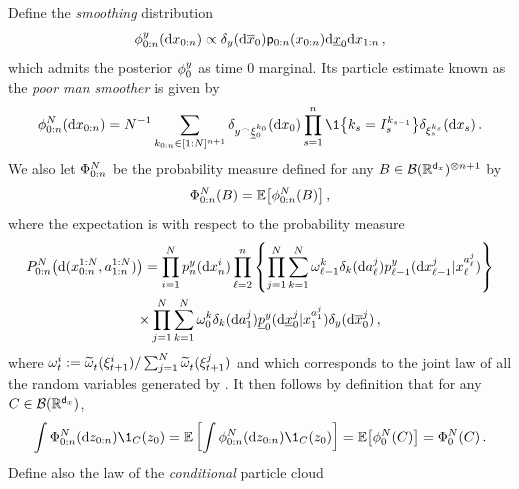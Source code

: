 Define the \emph{smoothing} distribution 
\begin{equation} 
    \filter{0:n}{y}{\rmd \lstate_{0:n}} \propto \delta_{\lmeas}(\rmd \ltopstate_0) \bwmarg{0:n}{\lstate_{0:n}}  \rmd \lbottomstate_0 \rmd \lstate_{1:n} \eqsp,
\end{equation}
which admits the posterior $\filter{0}{\lmeas}{}$ as time $0$ marginal. Its particle estimate known as the \emph{poor man smoother} is given by 
\begin{equation} 
    \filter{0:n}{N}{\rmd x_{0:n}} = N^{-1} \sum_{k_{0:n} \in [1:N]^{n+1}}  \delta_{\cat{\lmeas}{\bparticle^{k_0}_{0}}}(\rmd x_0) \prod_{s = 1}^n \1 \big\{ k_s = \anc{k_{s-1}}{s} \big\} \delta_{\particle^{k_s} _{s}}(\rmd x_s) \eqsp.
\end{equation}
We also let $\bfilter{0:n}{N}{}$ be the probability measure defined for any $B \in \mathcal{B}(\mathbb{R}^{{\mathsf{d}_x}})^{\otimes n+1}$ by 
\[ 
    \bfilter{0:n}{N}{B} = \pE \big[ \filter{0:n}{N}{B} \big] \eqsp,
\]
where the expectation is with respect to the probability measure 
\begin{multline} 
    \lawSMC{0:n}\big(\rmd (\lstate^{1:N} _{0:n}, \ianc{1:N}{1:n}) \big) = \prod_{i = 1}^N \bwopt{n}{\lmeas}{}{}(\rmd \lstate^i _n) \prod_{\ell = 2}^n \left\{ \prod_{j = 1}^{N} \sum_{k = 1}^N \weight{k}{\ell-1} \delta_k(\rmd \ianc{j}{\ell}) \bwopt{\ell-1}{y}{\iparticle{\ianc{j}{\ell}}{\ell}}{\rmd \iparticle{j}{\ell-1}} \right\} \\
    \times \prod_{j = 1}^{N} \sum_{k = 1}^N \weight{k}{0} \delta_k(\rmd \ianc{j}{1}) \bbwopt{0}{y}{\iparticle{\ianc{j}{1}}{1}}{\rmd \lbottomstate^j _0} \delta_{\lmeas}(\rmd \ltopstate^j _0) \eqsp,
\end{multline}
where $\omega^{i} _{t} := \widetilde{\omega}^{} _{t}(\xi^i _{t+1}) / \sum_{j = 1}^N \widetilde{\omega}^{} _{t}(\xi^j _{t+1})$ and 
which corresponds to the joint law of all the random variables generated by .
It then follows by definition that for any $C \in \mathcal{B}(\mathbb{R}^{{\mathsf{d}_x}})$,
\[ 
    \int \bfilter{0:n}{N}{\rmd z_{0:n}} \1_C(z_0) = \pE \left[ \int \filter{0:n}{N}{\rmd z_{0:n}} \1_C(z_0) \right] = \pE \big[ \filter{0}{N}{C} \big] = \bfilter{0}{N}{C} \eqsp.
\]
Define also the law of the \emph{conditional} particle cloud 
